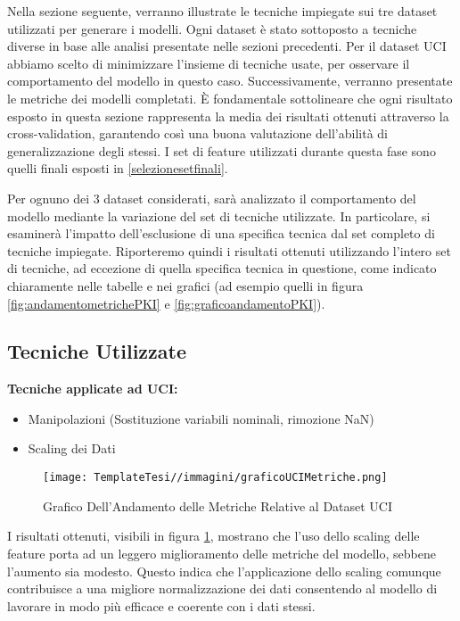 \begin{flushleft}
Nella sezione seguente, verranno illustrate le tecniche impiegate sui tre dataset utilizzati per generare i modelli. Ogni dataset è stato sottoposto a tecniche diverse in base alle analisi presentate nelle sezioni precedenti. Per il dataset UCI abbiamo scelto di minimizzare l'insieme di tecniche usate, per osservare il comportamento del modello in questo caso. Successivamente, verranno presentate le metriche dei modelli completati. 
È fondamentale sottolineare che ogni risultato esposto in questa sezione rappresenta la media dei risultati ottenuti attraverso la cross-validation, garantendo così una buona valutazione dell'abilità di generalizzazione degli stessi.
I set di feature utilizzati durante questa fase sono quelli finali esposti in \ref{selezionesetfinali}.

Per ognuno dei 3 dataset considerati, sarà analizzato il comportamento del modello mediante la variazione del set di tecniche utilizzate. In particolare, si esaminerà l'impatto dell'esclusione di una specifica tecnica dal set completo di tecniche impiegate. Riporteremo quindi i risultati ottenuti utilizzando l'intero set di tecniche, ad eccezione di quella specifica tecnica in questione, come indicato chiaramente nelle tabelle e nei grafici (ad esempio quelli in figura \ref{fig:andamentometrichePKI} e \ref{fig:graficoandamentoPKI}).

\subsection{Tecniche Utilizzate}


\textbf{Tecniche applicate ad UCI:}
\begin{itemize}
    \item Manipolazioni (Sostituzione variabili nominali, rimozione NaN)
    \item Scaling dei Dati
\end{itemize}




\begin{figure}[H]
    \centering
    \texttt{[image: TemplateTesi//immagini/graficoUCIMetriche.png]}
    \caption{Grafico Dell'Andamento delle Metriche Relative al Dataset UCI}
    \label{fig:graficoandamentoUCI}
\end{figure}

I risultati ottenuti, visibili in figura \ref{fig:graficoandamentoUCI}, mostrano che l'uso dello scaling delle feature porta ad un leggero miglioramento delle metriche del modello, sebbene l'aumento sia modesto. Questo indica che l'applicazione dello scaling comunque contribuisce a una migliore normalizzazione dei dati consentendo al modello di lavorare in modo più efficace e coerente con i dati stessi.



\end{flushleft}
